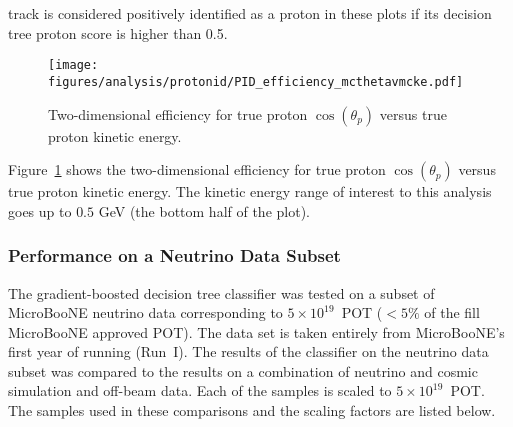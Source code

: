     track is considered positively identified as a proton in these plots if its
    decision tree proton score is higher than 0.5.
    \begin{figure}[ht]
      \centering
      \texttt{[image: figures/analysis/protonid/PID\_efficiency\_mcthetavmcke.pdf]}
      \caption{Two-dimensional efficiency for true proton $\cos(\theta_p)$
      versus true proton kinetic energy.}
      \label{fig:pideffthetake}
    \end{figure}
    Figure~\ref{fig:pideffthetake} shows the two-dimensional efficiency for
    true proton $\cos(\theta_p)$ versus true proton kinetic energy. The kinetic
    energy range of interest to this analysis goes up to $0.5$ GeV (the bottom
    half of the plot).

  \subsubsection{Performance on a Neutrino Data Subset}\label{sec:datamcpid}
    The gradient-boosted decision tree classifier was tested on a subset of
    MicroBooNE neutrino data corresponding to $5\times 10^{19}$~POT ($< 5\%$ of
    the fill MicroBooNE approved POT). The data set is taken entirely from
    MicroBooNE's first year of running (Run~I). The results of the classifier
    on the neutrino data subset was compared to the results on a combination of
    neutrino and cosmic simulation and off-beam data. Each of the samples is
    scaled to $5\times 10^{19}$~POT. The samples used in these comparisons and
    the scaling factors are listed below. 
